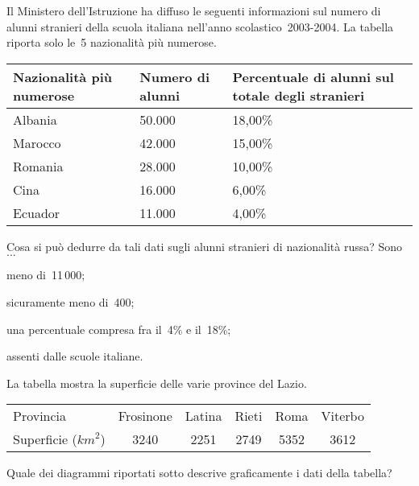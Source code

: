 \begin{esercizio}
\label{ese:A.58}
Il Ministero dell'Istruzione ha diffuso le seguenti informazioni sul numero di alunni stranieri della scuola italiana
nell'anno scolastico~2003-2004. La tabella riporta solo le~5 nazionalità più numerose.
\begin{center}
 \begin{tabularx}{.9\textwidth}{*{3}{X}}
\toprule
Nazionalità più numerose & Numero di alunni & Percentuale di alunni sul totale degli stranieri \\
\midrule
Albania & 50.000 & 18,00\% \\
Marocco & 42.000 & 15,00\% \\
Romania & 28.000 & 10,00\% \\
Cina & 16.000 & 6,00\% \\
Ecuador & 11.000 & 4,00\% \\
\bottomrule
\end{tabularx}
\end{center}

Cosa si può dedurre da tali dati sugli alunni stranieri di nazionalità russa? Sono~$\ldots$
\begin{enumeratea}
 \item meno di~11\,000;
 \item sicuramente meno di~400;
 \item una percentuale compresa fra il~4\% e il~18\%;
 \item assenti dalle scuole italiane.
\end{enumeratea}
\end{esercizio}
\begin{esercizio}
\label{ese:A.59}
La tabella mostra la superficie delle varie province del Lazio.
\begin{center}
 \begin{tabular}{l*{5}{c}}
 \toprule
 Provincia & Frosinone & Latina & Rieti & Roma & Viterbo\\
 Superficie ($\unit{km}^2$) & 3240& 2251& 2749& 5352& 3612\\
 \bottomrule
 \end{tabular}
\end{center}
Quale dei diagrammi riportati sotto descrive graficamente i dati della tabella?
\begin{center}
 
\end{center}

\end{esercizio}

